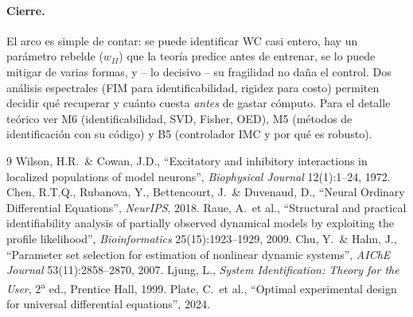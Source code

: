 \documentclass[11pt,a4paper]{article}
\begin{document}
\paragraph{Cierre.} El arco es simple de contar: se puede identificar WC casi entero, hay un parámetro rebelde ($w_{II}$) que la teoría predice antes de entrenar, se lo puede mitigar de varias formas, y \--- lo decisivo \--- su fragilidad no daña el control. Dos análisis espectrales (FIM para identificabilidad, rigidez para costo) permiten decidir qué recuperar y cuánto cuesta \emph{antes} de gastar cómputo. Para el detalle teórico ver M6 (identificabilidad, SVD, Fisher, OED), M5 (métodos de identificación con su código) y B5 (controlador IMC y por qué es robusto).

\begin{thebibliography}{9}
 Wilson, H.R.\ \& Cowan, J.D., ``Excitatory and inhibitory interactions in localized populations of model neurons'', \emph{Biophysical Journal} 12(1):1--24, 1972.
 Chen, R.T.Q., Rubanova, Y., Bettencourt, J.\ \& Duvenaud, D., ``Neural Ordinary Differential Equations'', \emph{NeurIPS}, 2018.
 Raue, A.\ et al., ``Structural and practical identifiability analysis of partially observed dynamical models by exploiting the profile likelihood'', \emph{Bioinformatics} 25(15):1923--1929, 2009.
 Chu, Y.\ \& Hahn, J., ``Parameter set selection for estimation of nonlinear dynamic systems'', \emph{AIChE Journal} 53(11):2858--2870, 2007.
 Ljung, L., \emph{System Identification: Theory for the User}, 2\textsuperscript{a} ed., Prentice Hall, 1999.
 Plate, C.\ et al., ``Optimal experimental design for universal differential equations'', 2024.
\end{thebibliography}
\end{document}
